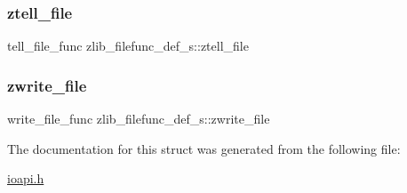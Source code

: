 \subsubsection{\texorpdfstring{ztell\+\_\+file}{ztell\_file}}
{\footnotesize\ttfamily tell\+\_\+file\+\_\+func zlib\+\_\+filefunc\+\_\+def\+\_\+s\+::ztell\+\_\+file}

\mbox{\label{structzlib__filefunc__def__s_a710b490fec793486ef5bedd9f2e1136d}} 
\subsubsection{\texorpdfstring{zwrite\+\_\+file}{zwrite\_file}}
{\footnotesize\ttfamily write\+\_\+file\+\_\+func zlib\+\_\+filefunc\+\_\+def\+\_\+s\+::zwrite\+\_\+file}



The documentation for this struct was generated from the following file\+:\begin{DoxyCompactItemize}
\item 
\hyperlink{ioapi_8h}{ioapi.\+h}\end{DoxyCompactItemize}

